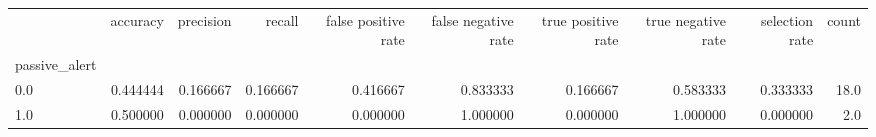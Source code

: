 \begin{tabular}{lrrrrrrrrr}
\toprule
{} &  accuracy &  precision &    recall &  false positive rate &  false negative rate &  true positive rate &  true negative rate &  selection rate &  count \\
passive\_alert &           &            &           &                      &                      &                     &                     &                 &        \\
\midrule
0.0           &  0.444444 &   0.166667 &  0.166667 &             0.416667 &             0.833333 &            0.166667 &            0.583333 &        0.333333 &   18.0 \\
1.0           &  0.500000 &   0.000000 &  0.000000 &             0.000000 &             1.000000 &            0.000000 &            1.000000 &        0.000000 &    2.0 \\
\bottomrule
\end{tabular}
